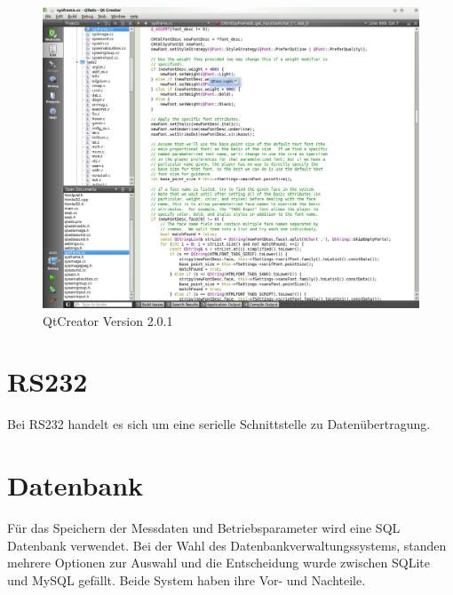 \begin{figure}[h]
\begin{center}
\includegraphics[width=\textwidth]{img/general/QtCreator.png}
\caption{QtCreator Version 2.0.1}
\label{QTCreator}
\end{center}
\end{figure}
\newpage

\section{RS232}
Bei RS232 handelt es sich um eine serielle Schnittstelle zu Datenübertragung.

\section{Datenbank}
\label{section_Datenbank}

Für das Speichern der Messdaten und Betriebsparameter wird eine \ac{SQL} Datenbank verwendet. Bei der Wahl des Datenbankverwaltungssystems, standen mehrere Optionen zur Auswahl und die Entscheidung wurde zwischen SQLite und MySQL gefällt.
Beide System haben ihre Vor- und Nachteile.


